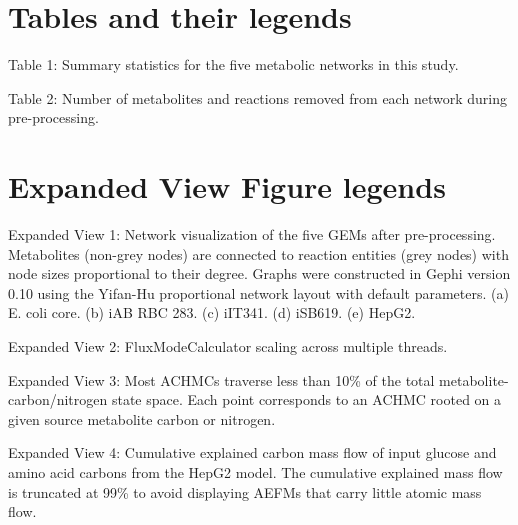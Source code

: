 \documentclass[12pt]{article}
\begin{document}
\section*{Tables and their legends}

\noindent Table 1: Summary statistics for the five metabolic networks in
this study.

\noindent Table 2: Number of metabolites and reactions removed from each
network during pre-processing.

\section*{Expanded View Figure legends}

\noindent Expanded View 1: Network visualization of the five GEMs after
pre-processing. Metabolites (non-grey nodes) are connected to reaction
entities (grey nodes) with node sizes proportional to their degree. Graphs
were constructed in Gephi version 0.10 using the Yifan-Hu proportional
network layout with default parameters. (a) E. coli core. (b) iAB RBC 283.
(c) iIT341. (d) iSB619. (e) HepG2.

\noindent Expanded View 2: FluxModeCalculator scaling across multiple
threads.

\noindent Expanded View 3: Most ACHMCs traverse less than 10\% of the
total metabolite-carbon/nitrogen state space. Each point corresponds to an
ACHMC rooted on a given source metabolite carbon or nitrogen.

\noindent Expanded View 4: Cumulative explained carbon mass flow of input
glucose and amino acid carbons from the HepG2 model. The cumulative
explained mass flow is truncated at 99\% to avoid displaying AEFMs that
carry little atomic mass flow.
\end{document}
